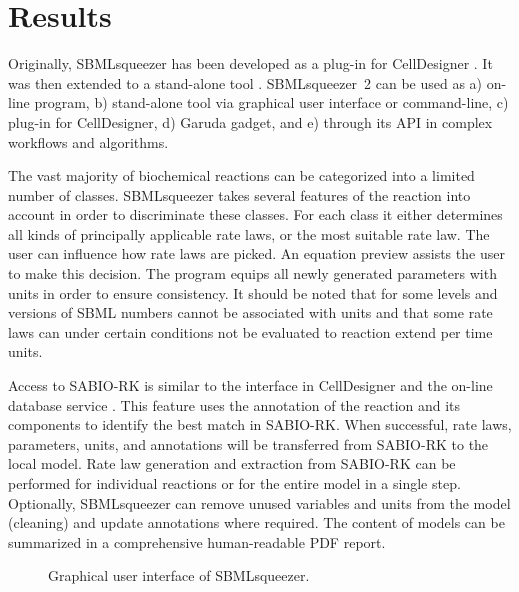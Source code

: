 \documentclass{bioinfo}
\begin{document}
\vspace{-.6cm}
\section{Results}

Originally, SBMLsqueezer has been developed as a plug-in for CellDesigner \citep{Draeger2008}.
It was then extended to a %
stand-alone tool \citep{Draeger2010}.
SBMLsqueezer~2 can be used as
a) on-line program,
b) stand-alone tool via graphical user interface or command-line,
c) plug-in for CellDesigner,
d) Garuda gadget, and
e) through its API in complex workflows and algorithms.

The vast majority of biochemical reactions can be categorized into a limited number of classes.
SBMLsqueezer takes several features of the reaction into account in order to discriminate these classes.
For each class it either determines all kinds of principally applicable rate laws, or the most suitable rate law.
The user can influence how rate laws are picked.
An equation preview assists the user to make this decision.
The program equips all newly generated parameters with units in order to ensure consistency.
It should be noted that for some levels and versions of SBML numbers cannot be associated with units and that some rate laws can under certain conditions not be evaluated to reaction extend per time units.

Access to SABIO-RK is similar to the interface in CellDesigner and the on-line database service \citep{Funahashi2007}.
This feature uses the annotation of the reaction and its components to identify the best match in SABIO-RK.
When successful, rate laws, parameters, units, and annotations will be transferred from SABIO-RK to the local model.
%
Rate law generation and extraction from SABIO-RK can be performed for individual reactions or for the entire model in a single step.
Optionally, SBMLsqueezer can remove unused variables and units from the model (cleaning) and update annotations where required.
The content of models can be summarized in a comprehensive human-readable PDF report.

\begin{figure}
\caption[Graphical user interface of SBMLsqueezer]{Graphical user interface of SBMLsqueezer.%
}\label{fig:SBMLsqueezer}
\vspace{-.45cm}
\end{figure}
\end{document}
